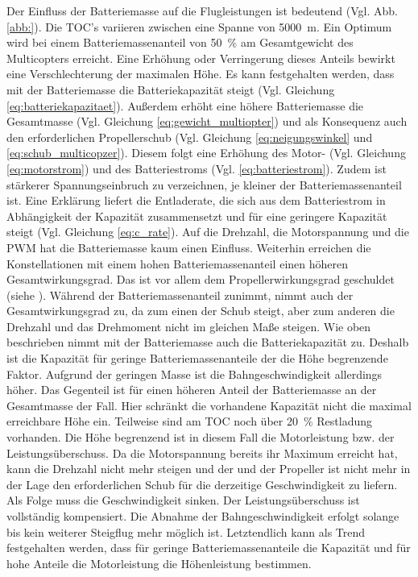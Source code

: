 Der Einfluss der Batteriemasse auf die Flugleistungen ist bedeutend (Vgl. Abb. \ref{abb:}). Die TOC's variieren zwischen eine Spanne von \SI{5000}{m}. Ein Optimum wird bei einem Batteriemassenanteil von \SI{50}{\%} am Gesamtgewicht des Multicopters erreicht. Eine Erhöhung oder Verringerung dieses Anteils bewirkt eine Verschlechterung der maximalen Höhe. Es kann festgehalten werden, dass mit der Batteriemasse die Batteriekapazität steigt (Vgl. Gleichung \ref{eq:batteriekapazitaet}). Außerdem erhöht eine höhere Batteriemasse die Gesamtmasse (Vgl. Gleichung \ref{eq:gewicht_multiopter}) und als Konsequenz auch den erforderlichen Propellerschub (Vgl. Gleichung \ref{eq:neigungswinkel} und \ref{eq:schub_multicopzer}). Diesem folgt eine Erhöhung des Motor- (Vgl. Gleichung \ref{eq:motorstrom}) und des Batteriestroms (Vgl. \ref{eq:batteriestrom}).
Zudem ist stärkerer Spannungseinbruch zu verzeichnen, je kleiner der Batteriemassenanteil ist. Eine Erklärung liefert die Entladerate, die sich aus dem Batteriestrom in Abhängigkeit der Kapazität zusammensetzt und für eine geringere Kapazität steigt (Vgl. Gleichung \ref{eq:c_rate}). Auf die Drehzahl, die Motorspannung und die PWM hat die Batteriemasse kaum einen Einfluss.
Weiterhin erreichen die Konstellationen mit einem hohen Batteriemassenanteil einen höheren Gesamtwirkungsgrad. Das ist vor allem dem Propellerwirkungsgrad geschuldet (siehe ). Während der Batteriemassenanteil zunimmt, nimmt auch der Gesamtwirkungsgrad zu, da zum einen der Schub steigt, aber zum anderen die Drehzahl und das Drehmoment nicht im gleichen Maße steigen. 
Wie oben beschrieben nimmt mit der Batteriemasse auch die Batteriekapazität zu. Deshalb ist die Kapazität für geringe Batteriemassenanteile der die Höhe begrenzende Faktor. Aufgrund der geringen Masse ist die Bahngeschwindigkeit allerdings höher. Das Gegenteil ist für einen höheren Anteil der Batteriemasse an der Gesamtmasse der Fall. Hier schränkt die vorhandene Kapazität nicht die maximal erreichbare Höhe ein. Teilweise sind am TOC noch über \SI{20}{\%} Restladung vorhanden. Die Höhe begrenzend ist in diesem Fall die Motorleistung bzw. der Leistungsüberschuss. Da die Motorspannung bereits ihr Maximum erreicht hat, kann die Drehzahl nicht mehr steigen und der und der Propeller ist nicht mehr in der Lage den erforderlichen Schub für die derzeitige Geschwindigkeit zu liefern. Als Folge muss die Geschwindigkeit sinken. Der Leistungsüberschuss ist vollständig kompensiert. Die Abnahme der Bahngeschwindigkeit erfolgt solange bis kein weiterer Steigflug mehr möglich ist. Letztendlich kann als Trend festgehalten werden, dass für geringe Batteriemassenanteile die Kapazität und für hohe Anteile die Motorleistung die Höhenleistung bestimmen. \\
